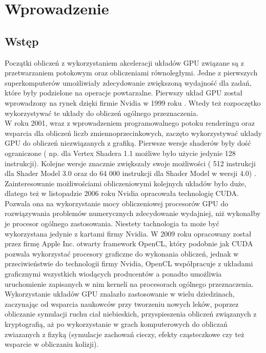 \chapter{Wprowadzenie}
\label{t:int}

\section{Wstęp}
Początki obliczeń z wykorzystaniem akceleracji układów GPU związane są z przetwarzaniem potokowym oraz obliczeniami równoległymi. Jedne z pierwszych superkomputerów umożliwiały zdecydowanie zwiększoną wydajność dla zadań, które były podzielone na operacje powtarzalne. Pierwszy układ GPU został wprowadzony na rynek dzięki firmie Nvidia w 1999 roku \cite{nvidia}. Wtedy też rozpoczętko wykorzystywać te układy do obliczeń ogólnego przeznaczenia. \\
W roku 2001, wraz z wprowadzeniem programowalnego potoku renderingu oraz wsparcia dla obliczeń liczb zmiennoprzecinkowych, zaczęto wykorzystywać układy GPU do obliczeń niezwiązanych z grafiką. Pierwsze wersje shaderów były dość ograniczone ( np. dla Vertex Shadera 1.1 możliwe było użycie jedynie 128 instrukcji). Kolejne wersje znacznie zwiększały swoje możliwości ( 512 instrukcji dla Shader Model 3.0 oraz do 64 000 instrukcji dla Shader Model w wersji 4.0) \cite{wiki1}. \\
Zainteresowanie możliwościami obliczeniowymi kolejnych układów było duże, dlatego też w listopadzie 2006 roku Nvidia opracowała technologię CUDA. Pozwala ona na wykorzystanie mocy obliczeniowej procesorów GPU do rozwiązywania problemów numerycznych zdecydowanie wydajniej, niż wykonałby je procesor ogólnego zastosowania. Niestety tachnologia ta może być wykorzystana jedynie z kartami firmy Nvidia. W 2009 roku opracowany został przez firmę Apple Inc. otwarty framework OpenCL, który podobnie jak CUDA pozwala wykorzystać procesory graficzne do wykonania obliczeń, jednak w przeciwieństwie do technologii firmy Nvidia, OpenCL współpracuje z układami graficznymi wszystkich wiodących producentów a ponadto umożliwia uruchomienie zapisanych w nim kerneli na procesorach ogólnego przeznaczenia. \\
Wykorzystanie układów GPU znalazło zastosowanie w wielu dziedzinach, zaczynając od wsparcia naukowców przy tworzeniu nowych leków, poprzez obliczanie symulacji ruchu ciał niebieskich, przyspieszenia obliczeń związanych z kryptografią, aż po wykorzystanie w grach komputerowych do obliczań zwiazanych z fizyką (symulacje zachowań cieczy, efekty cząsteczkowe czy też wsparcie w obliczaniu kolizji).

